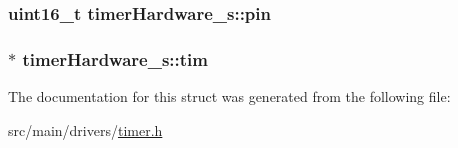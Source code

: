 \hypertarget{structtimerHardware__s_a2abeb9e9b441c53beb2190ecf699b6d2}{
\subsubsection[{pin}]{\setlength{\rightskip}{0pt plus 5cm}uint16\+\_\+t timer\+Hardware\+\_\+s\+::pin}}\label{structtimerHardware__s_a2abeb9e9b441c53beb2190ecf699b6d2}
\hypertarget{structtimerHardware__s_a2fdef5e9d564b356d89244cbf5bad80e}{
\subsubsection[{tim}]{$\ast$ timer\+Hardware\+\_\+s\+::tim}}\label{structtimerHardware__s_a2fdef5e9d564b356d89244cbf5bad80e}


The documentation for this struct was generated from the following file\+:\begin{DoxyCompactItemize}
\item 
src/main/drivers/\hyperlink{timer_8h}{timer.\+h}\end{DoxyCompactItemize}
